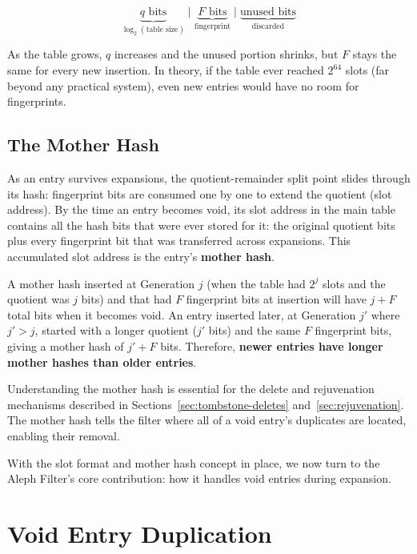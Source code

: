 \[
\underbrace{q \text{ bits}}_{\log_2(\text{table size})} \;\Big|\; 
\underbrace{F \text{ bits}}_{\text{fingerprint}} \;\Big|\; 
\underbrace{\text{unused bits}}_{\text{discarded}}
\]

As the table grows, $q$ increases and the unused portion shrinks, 
but $F$ stays the same for every new insertion. In theory, if the 
table ever reached $2^{64}$ slots (far beyond any practical system), 
even new entries would have no room for fingerprints.

\subsection{The Mother Hash}
\label{sec:mother-hash}

As an entry survives expansions, the quotient-remainder split point 
slides through its hash: fingerprint bits are consumed one by one to 
extend the quotient (slot address). By the time an entry becomes void, 
its slot address in the main table contains all the hash bits that 
were ever stored for it: the original quotient bits plus every 
fingerprint bit that was transferred across expansions. This 
accumulated slot address is the entry's \textbf{mother hash}.

A mother hash inserted at Generation $j$ (when the table had 
$2^j$ slots and the quotient was $j$ bits) and that had $F$ 
fingerprint bits at insertion will have $j + F$ total bits when it 
becomes void. An entry inserted later, at Generation $j'$ where 
$j' > j$, started with a longer quotient ($j'$ bits) and the same 
$F$ fingerprint bits, giving a mother hash of $j' + F$ bits. 
Therefore, \textbf{newer entries have longer mother hashes than 
older entries}.

Understanding the mother hash is essential for the delete and 
rejuvenation mechanisms described in 
Sections~\ref{sec:tombstone-deletes} and~\ref{sec:rejuvenation}. The 
mother hash tells the filter where all of a void entry's duplicates 
are located, enabling their removal.

With the slot format and mother hash concept in place, we now turn to 
the Aleph Filter's core contribution: how it handles void entries 
during expansion.


\section{Void Entry Duplication}
\label{sec:void-duplication}


